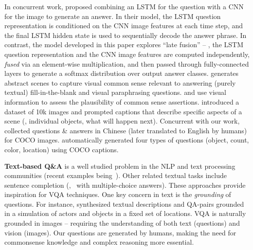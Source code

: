 In concurrent work, \cite{Malinowski_2015_ICCV} proposed combining an LSTM for the question 
with a CNN for the image to generate an answer. In their model, the LSTM question representation is conditioned on the CNN image features at each time step, and the final LSTM hidden state is used to sequentially decode the answer phrase. In contrast, the model developed in this paper explores ``late fusion'' -- \ie, the LSTM question representation and the CNN image features are computed independently, \emph{fused} via an element-wise multiplication, and then passed through fully-connected layers to generate a softmax distribution over output answer classes.
\cite{Lin_2015_CVPR} generates abstract scenes to capture visual common sense relevant to answering (purely textual) fill-in-the-blank and visual paraphrasing questions. \cite{Sadeghi_2015_CVPR} and \cite{Vendantam_2015_ICCV} use visual information to assess the plausibility of common sense assertions. \cite{Yu_2015_ICCV} introduced a dataset of 10k images and prompted captions that describe specific aspects of a scene (\eg, individual objects, what will happen next). 
Concurrent with our work, \cite{baiduVQA} collected questions \& answers in Chinese (later translated to English by humans) for COCO images. \cite{Ren_2015_NIPS} automatically generated four types of questions (object, count, color, location) using COCO captions.




\textbf{Text-based Q\&A}
is a well studied problem in the NLP and text processing communities (recent examples
being~\cite{zettlemoyer_kdd14,zettleymoyer_acl13,weston_qa,richardson2013mctest}).
Other related textual tasks include sentence
completion (\eg,~\cite{richardson2013mctest} with multiple-choice answers).
These approaches provide inspiration for VQA techniques.
One key concern in text is the \emph{grounding} of questions.
For instance, \cite{weston_qa} synthesized textual descriptions and QA-pairs
grounded in a simulation of actors and objects in a fixed set of locations.
VQA is naturally grounded in images -- requiring the understanding of both
text (questions) and vision (images).
Our questions are generated by humans, making the need for commonsense
knowledge and complex reasoning more essential.

